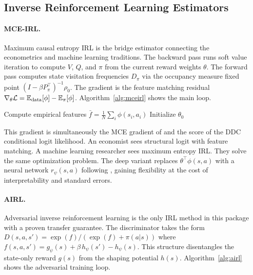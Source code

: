 \subsection{Inverse Reinforcement Learning Estimators}

\paragraph{MCE-IRL.}
Maximum causal entropy IRL \citep{ziebart2010} is the bridge estimator connecting the econometrics and machine learning traditions.
The backward pass runs soft value iteration to compute $V$, $Q$, and $\pi$ from the current reward weights $\theta$.
The forward pass computes state visitation frequencies $D_\pi$ via the occupancy measure fixed point $(I - \beta P_\pi^\top)^{-1}\rho_0$.
The gradient is the feature matching residual $\nabla_\theta \mathcal{L} = \mathbb{E}_{\text{data}}[\phi] - \mathbb{E}_\pi[\phi]$.
Algorithm~\ref{alg:mceirl} shows the main loop.

\begin{algorithm}[H]
\DontPrintSemicolon
\caption{MCE-IRL \citep{ziebart2010}}
\label{alg:mceirl}
Compute empirical features $\bar f = \frac{1}{N}\sum_i \phi(s_i, a_i)$\;
Initialize $\theta_0$\;
\end{algorithm}

This gradient is simultaneously the MCE gradient of \citet{ziebart2010} and the score of the DDC conditional logit likelihood.
An economist sees structural logit with feature matching.
A machine learning researcher sees maximum entropy IRL.
They solve the same optimization problem.
The deep variant replaces $\theta^\top\phi(s,a)$ with a neural network $r_\psi(s,a)$ following \citet{wulfmeier2016}, gaining flexibility at the cost of interpretability and standard errors.

\paragraph{AIRL.}
Adversarial inverse reinforcement learning \citep{fu2018} is the only IRL method in this package with a proven transfer guarantee.
The discriminator takes the form $D(s,a,s') = \exp(f)/(\exp(f) + \pi(a|s))$ where $f(s,a,s') = g_\psi(s) + \beta\, h_\psi(s') - h_\psi(s)$.
This structure disentangles the state-only reward $g(s)$ from the shaping potential $h(s)$.
Algorithm~\ref{alg:airl} shows the adversarial training loop.

